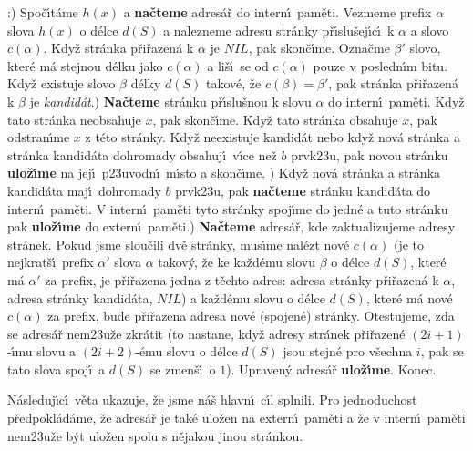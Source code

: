 :) Spo\v c\'\i t\'ame $h(x)$ a {\bf na\v cteme} adres\'a\v r do intern\'\i\ pam\v eti. 
Vez\-me\-me prefix $\alpha$ slova $h(x)$ o d\'elce $d(S)$ a nalezneme 
adresu str\'anky p\v r\'\i slu\v sej\'\i c\'\i\ k $\alpha$ a slovo $
c(\alpha )$. 
Kdy\v z str\'anka p\v ri\v razen\'a k $\alpha$ je $NIL$, pak skon\v c\'\i me. 
Ozna\v cme $\beta'$ slovo, kter\'e m\'a stejnou d\'elku jako $c(\alpha 
)$ a 
li\v s\'\i\ se od $c(\alpha )$ pouze v posledn\'\i m bitu. Kdy\v z existuje 
slovo $\beta$ d\'elky $d(S)$ takov\'e, \v ze $c(\beta )=\beta'$, pak str\'anka 
p\v ri\v razen\'a k $\beta$ je \emph{kandid\'at}.) {\bf Na\v cteme} str\'anku p\v r\'\i slu\v snou k slovu $\alpha$ do intern\'\i\ 
pam\v eti. Kdy\v z tato str\'anka neobsahuje $x$, pak skon\v c\'\i me. 
Kdy\v z tato str\'anka obsahuje $x$, pak odstran\'\i me $x$ z t\'eto 
str\'anky. Kdy\v z neexistuje kandid\'at nebo kdy\v z nov\'a 
str\'anka a str\'anka kandid\'ata dohromady obsahuj\'\i\ v\'\i ce ne\v z $
b$ 
prvk\accent23u, pak novou str\'anku {\bf ulo\-\v z\'\i me} na jej\'\i\ 
p\accent23uvodn\'\i\ m\'\i sto a skon\v c\'\i me. \newline 
3) Kdy\v z nov\'a str\'anka a str\'anka kandid\'ata maj\'\i\ 
dohromady $b$ prvk\accent23u, pak {\bf na\v cteme} str\'anku 
kandid\'ata do intern\'\i\ pam\v eti. V intern\'\i\ pam\v eti tyto 
str\'anky spoj\'\i me do jedn\'e a tuto str\'anku pak 
{\bf ulo\-\v z\'\i me} do extern\'\i\ pam\v eti.\newline 
4) {\bf Na\v cteme} adres\'a\v r, kde zaktualizujeme adresy 
str\'anek. Po\-kud jsme slou\v cili dv\v e str\'anky, mus\'\i me nal\'ezt 
nov\'e $c(\alpha )$ (je to nejkrat\v s\'\i\ prefix $\alpha'$ slova $
\alpha$ takov\'y, \v ze 
ke ka\v zd\'emu slovu $\beta$ o d\'elce $d(S)$, kter\'e m\'a $\alpha'$ za prefix, 
je p\v ri\v razena jedna z t\v echto adres: adresa str\'anky 
p\v ri\v razen\'a k $\alpha$, adresa str\'anky kandid\'ata, $NIL$) a ka\v zd\'emu 
slovu o d\'elce $d(S)$, kter\'e m\'a nov\'e $c(\alpha )$ za prefix, bude 
p\v ri\v razena adresa nov\'e (spojen\'e) str\'anky. Otestujeme, zda 
se adres\'a\v r nem\accent23u\v ze zkr\'atit (to nastane, kdy\v z 
adresy str\'anek p\v ri\v razen\'e $(2i+1)$-\'\i mu slovu a $(2i+
2)$-\'emu 
slovu o d\'elce $d(S)$ jsou stejn\'e pro v\v sechna $i$, 
pak se tato slova spoj\'\i\ a $d(S)$ se zmen\v s\'\i\ o $1$). Upraven\'y 
adres\'a\v r {\bf ulo\v z\'\i me}. Konec.
\bigskip

\flushpar N\'asleduj\'\i c\'\i\ v\v eta ukazuje, \v ze jsme n\'a\v s hlavn\'\i\ c\'\i l splnili. Pro jednoduchost p\v redpokl\'ad\'ame, \v ze 
adres\'a\v r je tak\'e ulo\v zen na extern\'\i\ pam\v eti a \v ze v 
intern\'\i\ pam\v eti nem\accent23u\v ze b\'yt ulo\v zen spolu s n\v ejakou jinou str\'ankou. 

